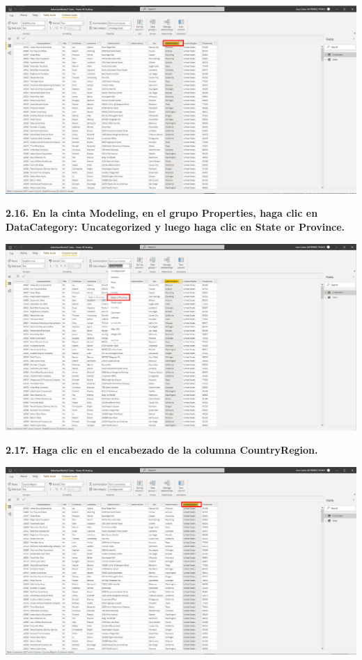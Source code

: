 \documentclass{article}
\begin{document}
    \begin{center}
		\includegraphics[width=14cm]{./images/28} 
	\end{center}
	
\textbf{2.16. En la cinta \textbf{Modeling}, en el grupo \textbf{Properties}, haga clic en \textbf{DataCategory: Uncategorized} y luego haga clic en \textbf{State or Province}.}

    \begin{center}
		\includegraphics[width=14cm]{./images/29} 
	\end{center}
\newpage	
\textbf{2.17. Haga clic en el encabezado de la columna \textbf{CountryRegion}.}

    \begin{center}
		\includegraphics[width=14cm]{./images/30} 
	\end{center}
	
\end{document}
